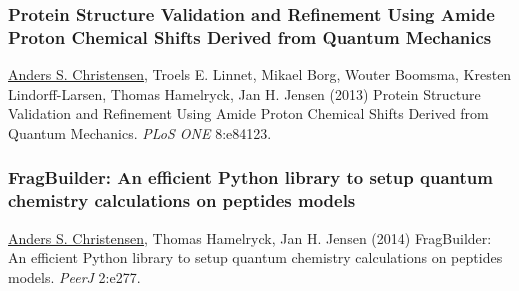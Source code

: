\subsubsection{Protein Structure Validation and Refinement Using Amide Proton Chemical Shifts Derived from Quantum Mechanics}
\underline{Anders S. Christensen}, Troels E. Linnet, Mikael Borg, Wouter Boomsma, Kresten Lindorff-Larsen, Thomas Hamelryck, Jan H. Jensen (2013)  Protein Structure Validation and Refinement Using Amide Proton Chemical Shifts Derived from Quantum Mechanics. \textit{PLoS ONE} 8:e84123.
\clearpage


\subsubsection{FragBuilder: An efficient Python library to setup quantum chemistry calculations on peptides models}
\underline{Anders S. Christensen}, Thomas Hamelryck, Jan H. Jensen (2014) FragBuilder: An efficient Python library to setup quantum chemistry calculations on peptides models. \textit{PeerJ} 2:e277.
\clearpage



